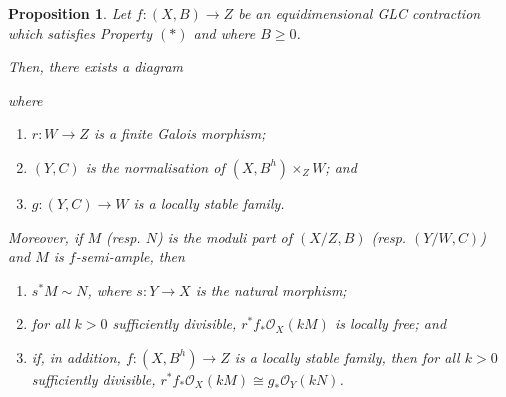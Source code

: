 \documentclass[12pt]{amsart}
\theoremstyle{plain}
\newtheorem{proposition}[theorem]{Proposition}
\theoremstyle{definition}
\begin{document}
\begin{proposition}
\label{prop_equi*_cover}
Let $f\colon (X, B) \rightarrow Z$ be an equidimensional GLC 
contraction which satisfies Property $(*)$ and where $B \geq 0$.

Then, there exists a diagram

\begin{center}
\end{center}

where 
\begin{enumerate}
\item $r\colon W \rightarrow Z$ is a finite Galois morphism; 
\item  $(Y, C)$ is the normalisation of $(X, B^h)\times_ZW$; and
\item $g\colon (Y, C) \rightarrow W$ is a locally stable family.
\end{enumerate}

Moreover, if $M$ (resp. $N$) is the moduli part of $(X/Z, B)$ (resp. $(Y/W, C)$) 
and $M$ is $f$-semi-ample,
then 
\begin{enumerate}
\item $s^*M \sim N$, where $s\colon Y \rightarrow X$ is the natural morphism;
\item   for all $k >0$ sufficiently divisible, $r^*f_*\mathcal O_X(kM)$ is locally free; and 
 \item if, in addition, $f\colon (X, B^h) \to Z$ is a locally stable family, then for all $k >0$ sufficiently divisible, $r^*f_*\mathcal O_X(kM) \cong g_*\mathcal O_Y(kN)$.
\end{enumerate}
\end{proposition}
\end{document}
